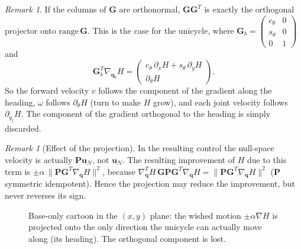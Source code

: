 \documentclass[11pt,a4paper]{article}
\newcommand{\qbase}{\bm{q}_b}
\newcommand{\Gbase}{\bm{G}_b}
\newcommand{\grad}{\nabla_{\!\bm{q}}}
\theoremstyle{plain}
\theoremstyle{definition}
\theoremstyle{remark}
\newtheorem{remark}[theorem]{Remark}
\begin{document}
\begin{remark}
If the columns of $\bm G$ are orthonormal, $\bm G\bm G^T$ is exactly the orthogonal projector onto $\mathrm{range}\,\bm G$. This is the case for the unicycle, where $\Gbase=\begin{pmatrix}c_\theta&0\\ s_\theta&0\\0&1\end{pmatrix}$ and
\[
\Gbase^T\nabla_{\qbase}H=\begin{pmatrix}c_\theta\,\partial_xH+s_\theta\,\partial_yH\\ \partial_\theta H\end{pmatrix}.
\]
So the forward velocity $v$ follows the component of the gradient along the heading, $\omega$ follows $\partial_\theta H$ (turn to make $H$ grow), and each joint velocity follows $\partial_{q_j}H$. The component of the gradient orthogonal to the heading is simply discarded.
\end{remark}

\begin{remark}[Effect of the projection]
In the resulting control the null-space velocity is actually $\bm P\bm u_N$, not $\bm u_N$. The resulting improvement of $H$ due to this term is $\pm\alpha\,\|\bm P\bm G^T\grad H\|^2$, because $\grad^{\!T}H\,\bm G\bm P\bm G^T\grad H=\|\bm P\bm G^T\grad H\|^2$ ($\bm P$ symmetric idempotent). Hence the projection may reduce the improvement, but never reverses its sign.
\end{remark}

\begin{figure}[ht]
\centering
{}
\caption{Base-only cartoon in the $(x,y)$ plane: the wished motion $\pm\alpha\nabla H$ is projected onto the only direction the unicycle can actually move along (its heading). The orthogonal component is lost.}
\end{figure}
\end{document}
